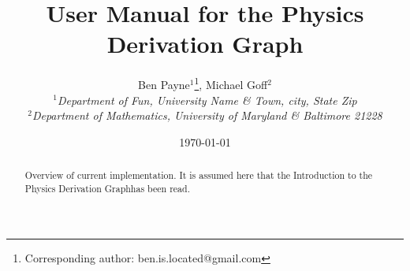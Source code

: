 \documentclass{article}
\newcommand{\pdg}{Physics Derivation Graph}
\begin{document}
\title{User Manual for the Physics Derivation Graph}

\author{Ben Payne$^{1}$\footnote{Corresponding author: ben.is.located@gmail.com}, Michael Goff$^{2}$\\
{\it $^{1}$Department of Fun, University Name \& Town, city, State Zip}\\
{\it $^{2}$Department of Mathematics, University of Maryland \& Baltimore 21228}}

\date{\today}


\maketitle %
\begin{abstract}
Overview of current implementation. It is assumed here that the Introduction to the \pdg has been read. 
\end{abstract}
\end{document}
